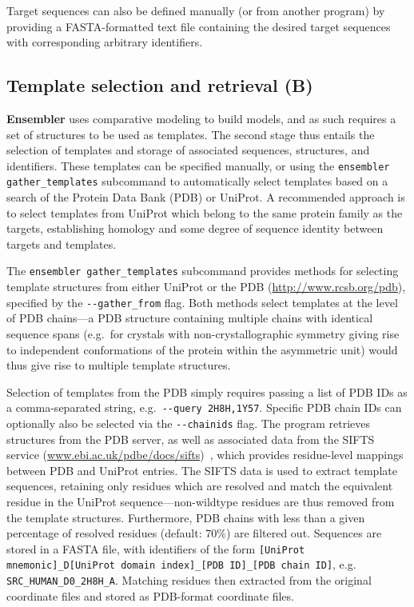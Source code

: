 \documentclass[10pt,letterpaper]{article}
\begin{document}
Target sequences can also be defined manually (or from another program) by providing a FASTA-formatted text file containing the desired target sequences with corresponding arbitrary identifiers.

\subsection*{Template selection and retrieval (B)}

{\bf Ensembler} uses comparative modeling to build models, and as such requires a set of structures to be used as templates.
The second stage thus entails the selection of templates and storage of associated sequences, structures, and identifiers.
These templates can be specified manually, or using the {\tt ensembler gather\_templates} subcommand to automatically select templates based on a search of the Protein Data Bank (PDB) or UniProt.
A recommended approach is to select templates from UniProt which belong to the same protein family as the targets, establishing homology and some degree of sequence identity between targets and templates.

The {\tt ensembler gather\_templates} subcommand provides methods for selecting template structures from either UniProt or the PDB (\url{http://www.rcsb.org/pdb}), specified by the {\tt -{}-gather\_from} flag.
Both methods select templates at the level of PDB chains---a PDB structure containing multiple chains with identical sequence spans (e.g.~for crystals with non-crystallographic symmetry giving rise to independent conformations of the protein within the asymmetric unit) would thus give rise to multiple template structures.

Selection of templates from the PDB simply requires passing a list of PDB IDs as a comma-separated string, e.g.~{\tt -{}-query 2H8H,1Y57}.
Specific PDB chain IDs can optionally also be selected via the {\tt -{}-chainids} flag.
The program retrieves structures from the PDB server, as well as associated data from the SIFTS service (\href{http://www.ebi.ac.uk/pdbe/docs/sifts/}{www.ebi.ac.uk/pdbe/docs/sifts})~\cite{velankar:2013:sifts}, which provides residue-level mappings between PDB and UniProt entries.
The SIFTS data is used to extract template sequences, retaining only residues which are resolved and match the equivalent residue in the UniProt sequence---non-wildtype residues are thus removed from the template structures.
Furthermore, PDB chains with less than a given percentage of resolved residues (default: 70\%) are filtered out.
Sequences are stored in a FASTA file, with identifiers of the form {\tt [UniProt mnemonic]\_D[UniProt domain index]\_[PDB ID]\_[PDB chain ID]}, e.g. {\tt SRC\_HUMAN\_D0\_2H8H\_A}.
Matching residues then extracted from the original coordinate files and stored as PDB-format coordinate files.
\end{document}
